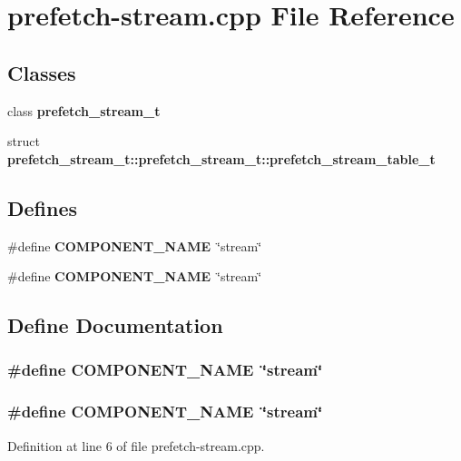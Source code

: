 \section{prefetch-stream.cpp File Reference}
\label{prefetch-stream_8cpp}
\subsection*{Classes}
\begin{CompactItemize}
\item 
class {\bf prefetch\_\-stream\_\-t}
\item 
struct {\bf prefetch\_\-stream\_\-t::prefetch\_\-stream\_\-t::prefetch\_\-stream\_\-table\_\-t}
\end{CompactItemize}
\subsection*{Defines}
\begin{CompactItemize}
\item 
\#define {\bf COMPONENT\_\-NAME}~\char`\"{}stream\char`\"{}
\item 
\#define {\bf COMPONENT\_\-NAME}~\char`\"{}stream\char`\"{}
\end{CompactItemize}


\subsection{Define Documentation}
\subsubsection[{COMPONENT\_\-NAME}]{\setlength{\rightskip}{0pt plus 5cm}\#define COMPONENT\_\-NAME~\char`\"{}stream\char`\"{}}\label{zesto-prefetch_8cpp_9146ade7ce24e3db226a973a59063892}


\subsubsection[{COMPONENT\_\-NAME}]{\setlength{\rightskip}{0pt plus 5cm}\#define COMPONENT\_\-NAME~\char`\"{}stream\char`\"{}}\label{prefetch-stream_8cpp_9146ade7ce24e3db226a973a59063892}




Definition at line 6 of file prefetch-stream.cpp.